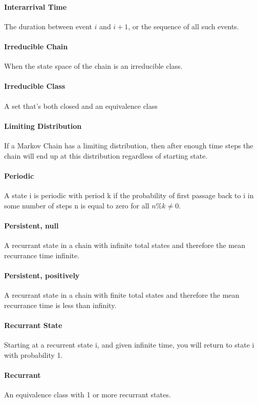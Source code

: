 \documentclass[12pt]{article}
\begin{document}
    \paragraph{Interarrival Time} The duration between event \(i\) and \(i+1\), or the sequence of all such events.
    \paragraph{Irreducible Chain} When the state space of the chain is an irreducible class.
    \paragraph{Irreducible Class} A set that's both closed and an equivalence class
    \paragraph{Limiting Distribution} If a Markov Chain has a limiting distribution, then after enough time steps the chain will end up at this distribution regardless of starting state.
    \paragraph{Periodic} A state i is periodic with period k if the probability of first passage back to i in some number of steps n is equal to zero for all \(n \% k \ne 0\).
    \paragraph{Persistent, null} A recurrant state in a chain with infinite total states and therefore the mean recurrance time infinite.
    \paragraph{Persistent, positively} A recurrant state in a chain with finite total states and therefore the mean recurrance time is less than infinity.
    \paragraph{Recurrant State} Starting at a recurrent state i, and given infinite time, you will return to state i with probability 1.
    \paragraph{Recurrant} An equivalence class with 1 or more recurrant states.
\end{document}
